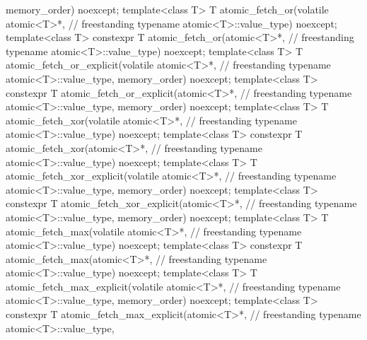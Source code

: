 \begin{codeblock}
{                                          memory_order) noexcept;
  template<class T>
    T atomic_fetch_or(volatile atomic<T>*,                                          // freestanding
                      typename atomic<T>::value_type) noexcept;
  template<class T>
    constexpr T atomic_fetch_or(atomic<T>*,                                         // freestanding
                                typename atomic<T>::value_type) noexcept;
  template<class T>
    T atomic_fetch_or_explicit(volatile atomic<T>*,                                 // freestanding
                               typename atomic<T>::value_type,
                               memory_order) noexcept;
  template<class T>
    constexpr T atomic_fetch_or_explicit(atomic<T>*,                                // freestanding
                                         typename atomic<T>::value_type,
                                         memory_order) noexcept;
  template<class T>
    T atomic_fetch_xor(volatile atomic<T>*,                                         // freestanding
                       typename atomic<T>::value_type) noexcept;
  template<class T>
    constexpr T atomic_fetch_xor(atomic<T>*,                                        // freestanding
                                 typename atomic<T>::value_type) noexcept;
  template<class T>
    T atomic_fetch_xor_explicit(volatile atomic<T>*,                                // freestanding
                                typename atomic<T>::value_type,
                                memory_order) noexcept;
  template<class T>
    constexpr T atomic_fetch_xor_explicit(atomic<T>*,                               // freestanding
                                          typename atomic<T>::value_type,
                                          memory_order) noexcept;
  template<class T>
    T atomic_fetch_max(volatile atomic<T>*,                                         // freestanding
                       typename atomic<T>::value_type) noexcept;
  template<class T>
    constexpr T atomic_fetch_max(atomic<T>*,                                        // freestanding
                                 typename atomic<T>::value_type) noexcept;
  template<class T>
    T atomic_fetch_max_explicit(volatile atomic<T>*,                                // freestanding
                                typename atomic<T>::value_type,
                                memory_order) noexcept;
  template<class T>
    constexpr T atomic_fetch_max_explicit(atomic<T>*,                               // freestanding
                                          typename atomic<T>::value_type,
}
\end{codeblock}
